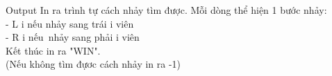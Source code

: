 Output
In ra trình tự cách nhảy tìm được. Mỗi dòng thể hiện 1 bước nhảy:   
\\   - L i  nếu nhảy sang trái i viên   
\\   - R i  nếu nhảy sang phải i viên   
\\   Kết thúc in ra "WIN".   
\\   (Nếu không tìm đựơc cách nhảy in ra -1)   
\\
\\
\\